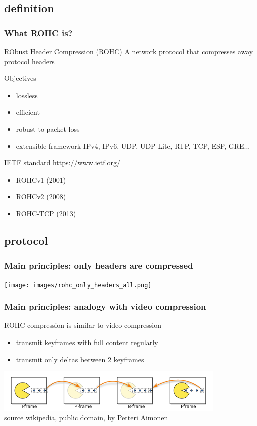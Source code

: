 \documentclass[utf8]{beamer}
\begin{document}
\subsection{definition}
\begin{frame}
	\frametitle{What ROHC is?}
	\begin{block}{RObust Header Compression (ROHC)}
		A network protocol that compresses away protocol headers
	\end{block}
	\pause
	\begin{block}{Objectives}
		\begin{itemize}
			\item lossless
			\item efficient
			\item robust to packet loss
			\item extensible framework {\tiny IPv4, IPv6, UDP, UDP-Lite, RTP, TCP, ESP, GRE...}
		\end{itemize}
	\end{block}
	\pause
	\begin{block}{IETF standard \tiny{https://www.ietf.org/}}
		\begin{itemize}
			\item \small{ROHCv1 (2001)}
			\item \small{ROHCv2 (2008)}
			\item \small{ROHC-TCP (2013)}
		\end{itemize}
	\end{block}
\end{frame}

\subsection{protocol}
\begin{frame}
	\frametitle{Main principles: only headers are compressed}
	\texttt{[image: images/rohc\_only\_headers\_all.png]}
\end{frame}

\begin{frame}
	\frametitle{Main principles: analogy with video compression}
	\begin{block}{ROHC compression is similar to video compression}
		\begin{itemize}
			\item transmit keyframes with full content regularly
			\item transmit only deltas between 2 keyframes
		\end{itemize}
		\includegraphics[width=110mm]{images/I_P_and_B_frames.png} \\
		{\tiny source wikipedia, public domain, by Petteri Aimonen}
	\end{block}
\end{frame}
\end{document}
